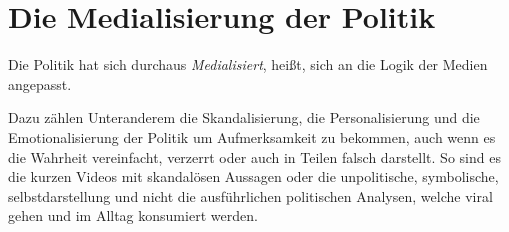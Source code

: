 \documentclass{article}
\begin{document}
\section{Die Medialisierung der Politik}
Die Politik hat sich durchaus \emph{Medialisiert}, heißt, sich an die Logik der Medien angepasst.
 
Dazu zählen Unteranderem die Skandalisierung, die Personalisierung und die Emotionalisierung der Politik um Aufmerksamkeit zu bekommen, auch wenn es die Wahrheit vereinfacht, verzerrt oder auch in Teilen falsch darstellt. So sind es die kurzen Videos mit skandalösen Aussagen oder die unpolitische, symbolische, selbstdarstellung und nicht die ausführlichen politischen Analysen, welche viral gehen und im Alltag konsumiert werden.
\end{document}
